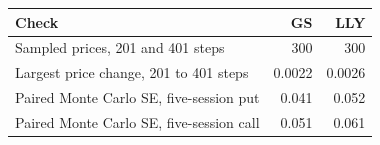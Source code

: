 \begin{tabular}{lrr}
\toprule
Check & GS & LLY \\
\midrule
Sampled prices, 201 and 401 steps & 300 & 300 \\
Largest price change, 201 to 401 steps & 0.0022 & 0.0026 \\
Paired Monte Carlo SE, five-session put & 0.041 & 0.052 \\
Paired Monte Carlo SE, five-session call & 0.051 & 0.061 \\
\bottomrule\end{tabular}
